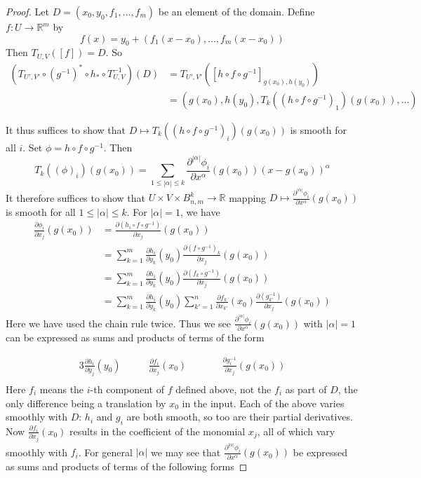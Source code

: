 \documentclass[12pt]{article}
\newcommand{\RR}{\mathbb{R}}
\begin{document}
\begin{proof} 
    Let $D = (x_0, y_0, f_1, \dots, f_m)$ be an element of the domain. Define $f: U \to \RR^m$ by 
    $$
    f(x) = y_0 + (f_1(x-x_0), \dots, f_m(x-x_0)) 
    $$
    Then $T_{U, V} ([f]) = D$. So
    \begin{align*}
        \left( T_{U', V'}\circ (g^{-1})^* \circ h_* \circ T_{U, V}^{-1} \right) (D) & = T_{U', V'} ([h\circ f \circ g^{-1}]_{g(x_0), h(y_0)}) \\ 
        & = (g(x_0), h(y_0), T_k \left( (h \circ f \circ g^{-1})_1\right) (g(x_0)), \dots)
    \end{align*}
    
    It thus suffices to show that $D \mapsto T_k \left( (h\circ f \circ g^{-1})_i\right) (g(x_0))$ is smooth for all $i$. Set $\phi = h \circ f \circ g^{-1}$. Then 
    $$
    T_k \left((\phi)_i\right) (g(x_0)) = \sum_{1\leq |\alpha| \leq k} \frac{\partial^{|\alpha|} \phi_i}{\partial x^{\alpha}} (g(x_0)) \left( x-g(x_0)\right)^\alpha
    $$
    It therefore suffices to show that $ U \times V \times B_{n, m}^k  \to \RR$ mapping $ D  \mapsto \frac{\partial^{|\alpha|} \phi_i}{\partial x^{\alpha}} (g(x_0))$ is smooth for all $1\leq |\alpha| \leq k$. For $|\alpha| = 1$, we have
    \begin{align*}
        \frac{\partial \phi_i}{\partial x_j}(g(x_0)) & = \frac{\partial (h_i \circ f \circ g^{-1})}{\partial x_j}(g(x_0)) \\ 
        & = \sum_{k=1}^m \frac{\partial h_i}{\partial y_k} (y_0) \frac{\partial (f\circ g^{-1})_k}{\partial x_j} (g(x_0))\\ 
        & = \sum_{k=1}^m \frac{\partial h_i}{\partial y_k} (y_0) \frac{\partial (f_k\circ g^{-1})}{\partial x_j} (g(x_0))\\ 
        & = \sum_{k=1}^m \frac{\partial h_i}{\partial y_k} (y_0) \sum_{k' = 1}^n \frac{\partial f_k}{\partial x_{k'}} (x_0) \frac{\partial (g^{-1}_{k'})}{\partial x_j} (g(x_0))
    \end{align*}
    Here we have used the chain rule twice. Thus we see $\frac{\partial^{|\alpha|} \phi_i}{\partial x^{\alpha}} (g(x_0))$ with $|\alpha| = 1$ can be expressed as sums and products of terms of the form
    
    \begin{alignat*}{3}
        \frac{\partial h_i}{\partial y_j} (y_0) \quad \quad & \frac{\partial f_i}{\partial x_j} (x_0) \quad \quad  && \frac{\partial g^{-1}_i}{\partial x_j} (g(x_0)) \\
    \end{alignat*}
    Here $f_i$ means the $i$-th component of $f$ defined above, not the $f_i$ as part of $D$, the only difference being a translation by $x_0$ in the input. Each of the above varies smoothly with $D$: $h_i$ and $g_i$ are both smooth, so too are their partial derivatives. Now $\frac{\partial f_i}{\partial x_j}(x_0)$ results in the coefficient of the monomial $x_j$, all of which vary smoothly with $f_i$. For general $|\alpha|$ we may see that $\frac{\partial^{|\alpha|} \phi_i}{\partial x^{\alpha}} (g(x_0))$ be expressed as sums and products of terms of the following forms
    

\end{proof}
\end{document}
